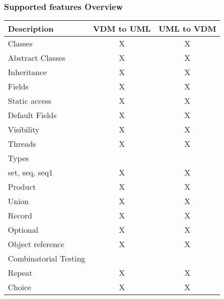 %
%
\frame
{
  \frametitle{Supported features Overview}
\begin{center}
\begin{tabular}{lcc}
  Description        & VDM to UML & UML to VDM \\\hline
  Classes            & X & X  \pause\\
  Abstract Classes   & X & X  \pause\\
  Inheritance        & X & X  \pause\\
  Fields             & X & X  \pause\\
  Static access      & X & X  \pause\\      
  Default Fields     & X & X  \pause\\
  Visibility         & X & X  \pause\\
  Threads            & X & X  \pause\\
  
  Types             & & \\\hline
  set, seq, seq1     & X & X  \pause\\
  Product            & X & X  \pause\\
  Union              & X & X  \pause\\
  Record             & X & X  \pause\\ 
  Optional           & X & X  \pause\\
  Object reference   & X & X  \pause\\
  
  Combinatorial Testing & & \\\hline
  Repeat             & X & X  \pause\\
  Choice             & X & X  \pause\\
  
  
\end{tabular}

\end{center}
}



